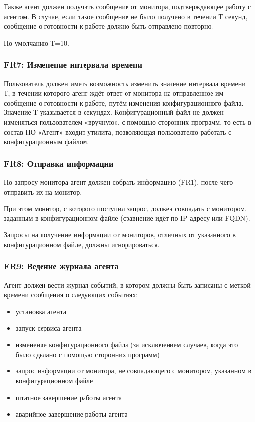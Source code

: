 Также агент должен получить сообщение от монитора, подтверждающее работу с агентом. В случае, если такое сообщение не было получено в течении Т секунд, сообщение о готовности к работе должно быть отправлено повторно.

По умолчанию Т=10.

\subsubsection{FR7: Изменение интервала времени}

Пользователь должен иметь возможность изменить значение интервала времени Т, в течении которого агент ждёт ответ от монитора на отправленное им сообщение о готовности к работе, путём изменения конфигурационного файла. Значение Т указывается в секундах. Конфигурационный файл не должен изменяться пользователем «вручную», с помощью сторонних программ, то есть в состав ПО «Агент» входит утилита, позволяющая пользователю работать с конфигурационным файлом.

\subsubsection{FR8: Отправка информации}

По запросу монитора агент должен собрать информацию (FR1), после чего отправить их на монитор. 

При этом монитор, с которого поступил запрос, должен совпадать с монитором, заданным в конфигурационном файле (сравнение идёт по IP адресу или FQDN).

Запросы на получение информации от мониторов, отличных от указанного в конфигурационном файле, должны игнорироваться.

\subsubsection{FR9: Ведение журнала агента}

Агент должен вести журнал событий, в котором должны быть записаны с меткой времени сообщения о следующих событиях:
\begin{itemize}
	\item установка агента
	\item запуск сервиса агента
	\item изменение конфигурационного файла (за исключением случаев, когда это было сделано с помощью сторонних программ)
	\item запрос информации от монитора, не совпадающего с монитором, указанном в конфигурационном файле
	\item штатное завершение работы агента
	\item аварийное завершение работы агента
\end{itemize}

